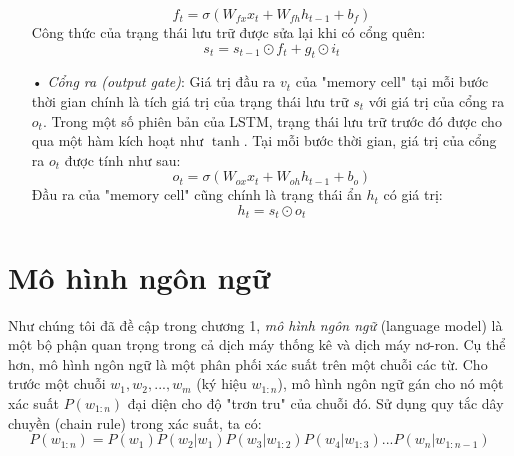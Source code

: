 \begin{itemize}
	\begin{equation} \label{forgetGateLSTM}
		f_t = \sigma \left(W_{fx}x_t + W_{fh}h_{t-1} + b_f \right)
	\end{equation}
	Công thức của trạng thái lưu trữ được sửa lại khi có cổng quên:
	\begin{equation} \label{cellStateWithForgetGateLSTM}
		s_t = s_{t-1} \odot f_t + g_t \odot i_t
	\end{equation}
	\item[•] \textit{Cổng ra (output gate)}: Giá trị đầu ra $v_t$ của "memory cell" tại mỗi bước thời gian chính là tích giá trị của trạng thái lưu trữ $s_t$ với giá trị của cổng ra $o_t$. Trong một số phiên bản của LSTM, trạng thái lưu trữ trước đó được cho qua một hàm kích hoạt như $\tanh$. Tại mỗi bước thời gian, giá trị của cổng ra $o_t$ được tính như sau:
	\begin{equation} \label{outputGateLSTM}
		o_t = \sigma \left(W_{ox}x_t + W_{oh}h_{t-1} + b_o \right)
	\end{equation}
	Đầu ra của "memory cell" cũng chính là trạng thái ẩn $h_t$ có giá trị:
	\begin{equation} \label{outputNodeLSTM}
		h_t = s_t \odot o_t 
	\end{equation}
\end{itemize}



\section{Mô hình ngôn ngữ}

Như chúng tôi đã đề cập trong chương 1, \textit{mô hình ngôn ngữ} (language model) là một bộ phận quan trọng trong cả dịch máy thống kê và dịch máy nơ-ron. Cụ thể hơn, mô hình ngôn ngữ là một phân phối xác suất trên một chuỗi các từ. Cho trước một chuỗi $w_1,w_2,...,w_m$ (ký hiệu $w_{1:n}$), mô hình ngôn ngữ gán cho nó một xác suất $P(w_{1:n})$ đại diện cho độ "trơn tru" của chuỗi đó. Sử dụng quy tắc dây chuyền (chain rule) trong xác suất, ta có:
\begin{equation} \label{lmGeneral}
	P(w_{1:n}) = P(w_1)P(w_2|w_1)P(w_3|w_{1:2})P(w_4|w_{1:3})...P(w_n|w_{1:n-1})
\end{equation}














